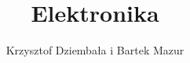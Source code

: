 %


\documentclass[a4paper,12pt, twoside]{article}

\usepackage{polski}
\usepackage[utf8]{inputenc}
\usepackage{listings}
\usepackage{graphicx}
\graphicspath{ {zdj/} }
\renewcommand*{\figurename}{Ilustracja} %
\usepackage{subcaption}
\usepackage[export]{adjustbox}
\usepackage{geometry}
\usepackage{titlesec}
\usepackage{fancyhdr}
\pagestyle{fancy}
\renewcommand{\sectionmark}[1]{\markright{#1}}		%
\fancyfoot[LE,RO]{\thepage}		%
\let\oldsection\section		%
\renewcommand\section{\clearpage\oldsection}%
\renewcommand{\subsectionmark}[1]{}%
\usepackage[section]{placeins}
\chead{\fancyplain{}{\rightmark }} %
\cfoot{\fancyplain{}{}} %
\lhead{\fancyplain{}{}} %
\usepackage[nottoc]{tocbibind}
\title{Elektronika}
\author{Krzysztof Dziembała i Bartek Mazur}



\maketitle

